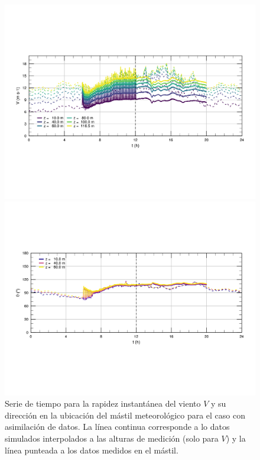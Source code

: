 \begin{figure}[H]
	\centering
	\includegraphics[width=1\linewidth,trim={9mm 63mm 10mm 55mm},clip]{Imagenes/06/hov_da/ts_v}%
	
	\includegraphics[width=1\linewidth,trim={12mm 55mm 10mm 55mm},clip]{Imagenes/06/hov_da/ts_o}%
	\caption{Serie de tiempo para la rapidez instantánea del viento $V$ y su dirección en la ubicación del mástil meteorológico para el caso con asimilación de datos. La línea continua corresponde a lo datos simulados interpolados a las alturas de medición (solo para $V$) y la línea punteada a los datos medidos en el mástil.}
	\label{fig:06_hov_da_ts}
\end{figure}


